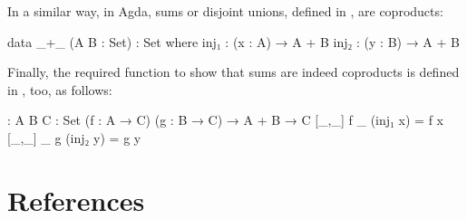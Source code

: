 \begin{example}
  \label{ex:coproduct-agda}


  In a similar way, in Agda, sums or disjoint unions, defined in
  , are coproducts:
  \begin{codeagda}
data _+_ (A B : Set) : Set where
  inj₁ : (x : A) → A + B
  inj₂ : (y : B) → A + B
  \end{codeagda}
  Finally, the required function to show that sums are indeed
  coproducts is defined in , too, as follows:
  \begin{codeagda}
[_,_] : {A B C : Set} (f : A → C) (g : B → C) → A + B → C
[_,_] f _ (inj₁ x) = f x
[_,_] _ g (inj₂ y) = g y
  \end{codeagda}

\end{example}

\section{References}
\label{sec:constructions-references}


\clearemptydoublepage
